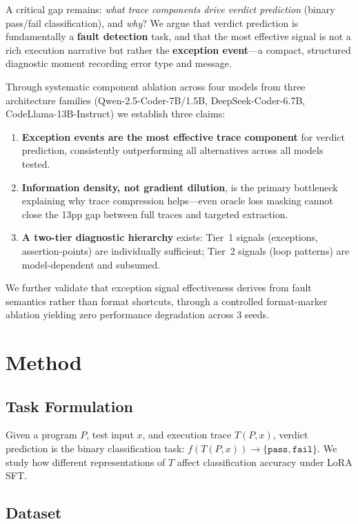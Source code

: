 \documentclass[11pt,a4paper]{article}
\begin{document}
A critical gap remains: \emph{what trace components drive verdict prediction} (binary pass/fail classification), and \emph{why}? We argue that verdict prediction is fundamentally a \textbf{fault detection} task, and that the most effective signal is not a rich execution narrative but rather the \textbf{exception event}---a compact, structured diagnostic moment recording error type and message.

Through systematic component ablation across four models from three architecture families (Qwen-2.5-Coder-7B/1.5B, DeepSeek-Coder-6.7B, CodeLlama-13B-Instruct) we establish three claims:

\begin{enumerate}
    \item \textbf{Exception events are the most effective trace component} for verdict prediction, consistently outperforming all alternatives across all models tested.
    \item \textbf{Information density, not gradient dilution}, is the primary bottleneck explaining why trace compression helps---even oracle loss masking cannot close the 13pp gap between full traces and targeted extraction.
    \item \textbf{A two-tier diagnostic hierarchy} exists: Tier~1 signals (exceptions, assertion-points) are individually sufficient; Tier~2 signals (loop patterns) are model-dependent and subsumed.
\end{enumerate}

We further validate that exception signal effectiveness derives from fault semantics rather than format shortcuts, through a controlled format-marker ablation yielding zero performance degradation across 3 seeds.

\section{Method}

\subsection{Task Formulation}

Given a program $P$, test input $x$, and execution trace $T(P, x)$, verdict prediction is the binary classification task: $f(T(P, x)) \rightarrow \{\texttt{pass}, \texttt{fail}\}$. We study how different representations of $T$ affect classification accuracy under LoRA SFT.

\subsection{Dataset}
\end{document}
